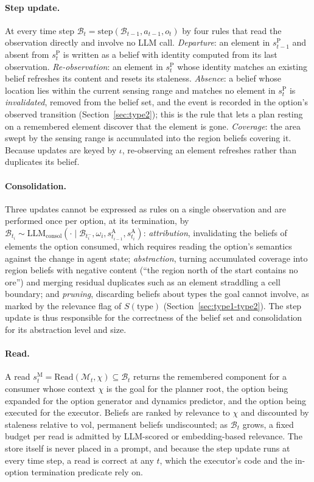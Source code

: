 \documentclass[10pt]{article}
\newcommand{\llm}[1]{\mathrm{LLM}_{\mathrm{#1}}}
\newcommand{\calM}{\mathcal{M}}
\newcommand{\calB}{\mathcal{B}}
\newcommand{\sA}{s^{\mathrm{A}}}
\newcommand{\sP}{s^{\mathrm{P}}}
\newcommand{\sM}{s^{\mathrm{M}}}
\newcommand{\Read}{\mathrm{Read}}
\newcommand{\vol}{\mathrm{vol}}
\newcommand{\type}{\mathrm{type}}
\begin{document}
\paragraph{Step update.}
At every time step $\calB_t=\mathrm{step}(\calB_{t-1},a_{t-1},o_t)$ by four rules that read the observation directly and involve no LLM call. \emph{Departure}: an element in $\sP_{t-1}$ and absent from $\sP_t$ is written as a belief with identity computed from its last observation. \emph{Re-observation}: an element in $\sP_t$ whose identity matches an existing belief refreshes its content and resets its staleness. \emph{Absence}: a belief whose location lies within the current sensing range and matches no element in $\sP_t$ is \emph{invalidated}, removed from the belief set, and the event is recorded in the option's observed transition (Section~\ref{sec:type2}); this is the rule that lets a plan resting on a remembered element discover that the element is gone. \emph{Coverage}: the area swept by the sensing range is accumulated into the region beliefs covering it. Because updates are keyed by $\iota$, re-observing an element refreshes rather than duplicates its belief.

\paragraph{Consolidation.}
Three updates cannot be expressed as rules on a single observation and are performed once per option, at its termination, by $\calB_{t_i}\sim\llm{consol}(\cdot\mid\calB_{t_i^-},\omega_i,\sA_{t_{i-1}},\sA_{t_i})$: \emph{attribution}, invalidating the beliefs of elements the option consumed, which requires reading the option's semantics against the change in agent state; \emph{abstraction}, turning accumulated coverage into region beliefs with negative content (``the region north of the start contains no ore'') and merging residual duplicates such as an element straddling a cell boundary; and \emph{pruning}, discarding beliefs about types the goal cannot involve, as marked by the relevance flag of $S(\type)$ (Section~\ref{sec:type1-type2}). The step update is thus responsible for the correctness of the belief set and consolidation for its abstraction level and size.

\paragraph{Read.}
A read $\sM_t=\Read(\calM_t,\chi)\subseteq\calB_t$ returns the remembered component for a consumer whose context $\chi$ is the goal for the planner root, the option being expanded for the option generator and dynamics predictor, and the option being executed for the executor. Beliefs are ranked by relevance to $\chi$ and discounted by staleness relative to $\vol$, permanent beliefs undiscounted; as $\calB_t$ grows, a fixed budget per read is admitted by LLM-scored or embedding-based relevance. The store itself is never placed in a prompt, and because the step update runs at every time step, a read is correct at any $t$, which the executor's code and the in-option termination predicate rely on.
\end{document}
